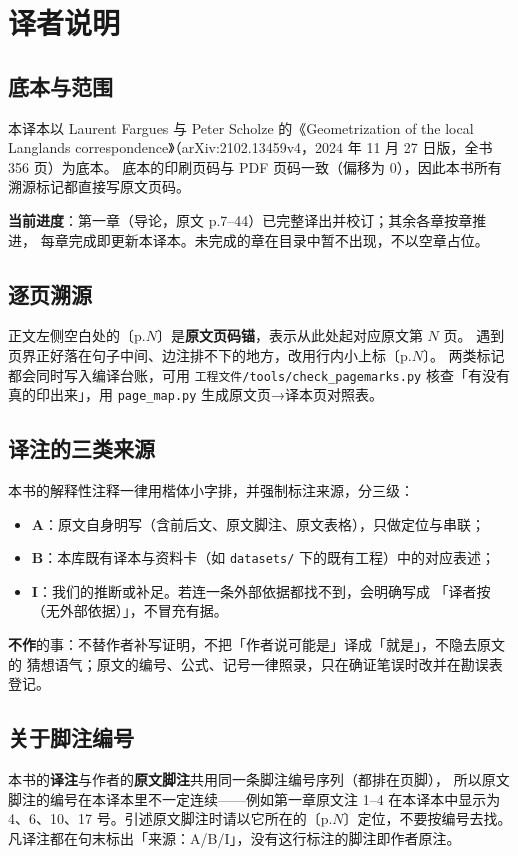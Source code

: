 \chapter*{译者说明}

\section*{底本与范围}
本译本以 Laurent Fargues 与 Peter Scholze 的《Geometrization of the local Langlands
correspondence》（arXiv:2102.13459v4，2024 年 11 月 27 日版，全书 356 页）为底本。
底本的印刷页码与 PDF 页码一致（偏移为 0），因此本书所有溯源标记都直接写原文页码。

\textbf{当前进度}：第一章（导论，原文 p.7–44）已完整译出并校订；其余各章按章推进，
每章完成即更新本译本。未完成的章在目录中暂不出现，不以空章占位。

\section*{逐页溯源}
正文左侧空白处的〔p.$N$〕是\textbf{原文页码锚}，表示从此处起对应原文第 $N$ 页。
遇到页界正好落在句子中间、边注排不下的地方，改用行内小上标〔p.$N$〕。
两类标记都会同时写入编译台账，可用 \texttt{工程文件/tools/check\_pagemarks.py}
核查「有没有真的印出来」，用 \texttt{page\_map.py} 生成原文页→译本页对照表。

\section*{译注的三类来源}
本书的解释性注释一律用楷体小字排，并强制标注来源，分三级：

\begin{itemize}
  \item \textbf{A}：原文自身明写（含前后文、原文脚注、原文表格），只做定位与串联；
  \item \textbf{B}：本库既有译本与资料卡（如 \texttt{datasets/} 下的既有工程）中的对应表述；
  \item \textbf{I}：我们的推断或补足。若连一条外部依据都找不到，会明确写成
        「译者按（无外部依据）」，不冒充有据。
\end{itemize}

\textbf{不作}的事：不替作者补写证明，不把「作者说可能是」译成「就是」，不隐去原文的
猜想语气；原文的编号、公式、记号一律照录，只在确证笔误时改并在勘误表登记。

\section*{关于脚注编号}
本书的\textbf{译注}与作者的\textbf{原文脚注}共用同一条脚注编号序列（都排在页脚），
所以原文脚注的编号在本译本里不一定连续——例如第一章原文注 1--4 在本译本中显示为
4、6、10、17 号。引述原文脚注时请以它所在的〔p.$N$〕定位，不要按编号去找。
凡译注都在句末标出「来源：A/B/I」，没有这行标注的脚注即作者原注。

